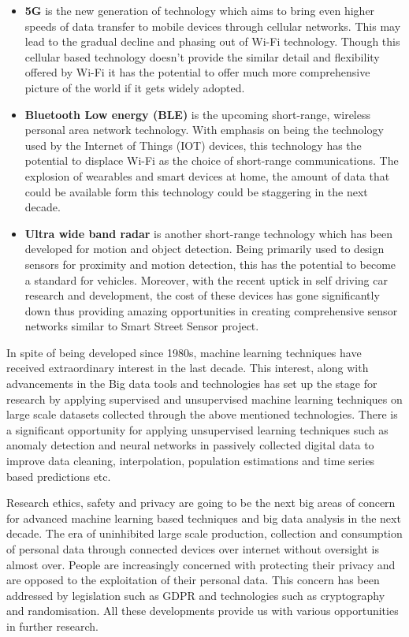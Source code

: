 \begin{itemize}
  \item \textbf{5G} is the new generation of technology which aims to bring even higher speeds of data transfer to mobile devices through cellular networks. This may lead to the gradual decline and phasing out of Wi-Fi technology. Though this cellular based technology doesn't provide the similar detail and flexibility offered by Wi-Fi it has the potential to offer much more comprehensive picture of the world if it gets  widely adopted.
  \item \textbf{Bluetooth Low energy (BLE)} is the upcoming short-range, wireless personal area network technology. With emphasis on being the technology used by the Internet of Things (IOT) devices, this technology has the potential to displace Wi-Fi as the choice of short-range communications. The explosion of wearables and smart devices at home, the amount of data that could be available form this technology could be staggering in the next decade.
  \item \textbf{Ultra wide band radar} is another short-range technology which has been developed for motion and object detection. Being primarily used to design sensors for proximity and motion detection, this has the potential to become a standard for vehicles. Moreover, with the recent uptick in self driving car research and development, the cost of these devices has gone significantly down thus providing amazing opportunities in creating comprehensive sensor networks similar to Smart Street Sensor project.
\end{itemize}

In spite of being developed since 1980s, machine learning techniques have received extraordinary interest in the last decade.
This interest, along with advancements in the Big data tools and technologies has set up the stage for research by applying supervised and unsupervised machine learning techniques on large scale datasets collected through the above mentioned technologies.
There is a significant opportunity for applying unsupervised learning techniques such as anomaly detection and neural networks in passively collected digital data to improve data cleaning, interpolation, population estimations and time series based predictions etc.

Research ethics, safety and privacy are going to be the next big areas of concern for advanced machine learning based techniques and big data analysis in the next decade.
The era of uninhibited large scale production, collection and consumption of personal data through connected devices over internet without oversight is almost over.
People are increasingly concerned with protecting their privacy and are opposed to the exploitation of their personal data.
This concern has been addressed by legislation such as GDPR and technologies such as cryptography and randomisation.
All these developments provide us with various opportunities in further research.


